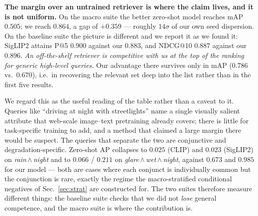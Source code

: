 \documentclass[10pt,twocolumn,letterpaper]{article}
\begin{document}
\noindent\textbf{The margin over an untrained retriever is where the claim
lives, and it is not uniform.} On the macro suite the better zero-shot model
reaches mAP $0.505$; we reach $0.864$, a gap of $+0.359$ --- roughly
$14\sigma$ of our own seed dispersion. On the baseline suite the picture is
different and we report it as we found it: SigLIP2 attains P@5 $0.900$
against our $0.883$, and NDCG@10 $0.887$ against our $0.896$. \emph{An
off-the-shelf retriever is competitive with us at the top of the ranking for
generic high-level queries.} Our advantage there survives only in mAP
($0.786$ vs.\ $0.670$), i.e.\ in recovering the relevant set deep into the
list rather than in the first five results.

We regard this as the useful reading of the table rather than a caveat to
it. Queries like ``driving at night with streetlights'' name a single
visually salient attribute that web-scale image--text pretraining already
covers; there is little for task-specific training to add, and a method that
claimed a large margin there would be suspect. The queries that separate the
two are conjunctive and degradation-specific. Zero-shot AP collapses to
$0.025$ (CLIP) and $0.023$ (SigLIP2) on \emph{rain\,$\wedge$\,night} and to
$0.066$ / $0.211$ on \emph{glare\,$\wedge$\,wet\,$\wedge$\,night}, against
$0.673$ and $0.985$ for our model --- both are cases where each conjunct is
individually common but the conjunction is rare, exactly the regime the
macro-stratified conditional negatives of Sec.~\ref{sec:strat}
are constructed for. The two suites therefore measure different things: the
baseline suite checks that we did not \emph{lose} general competence, and
the macro suite is where the contribution is.
\end{document}
